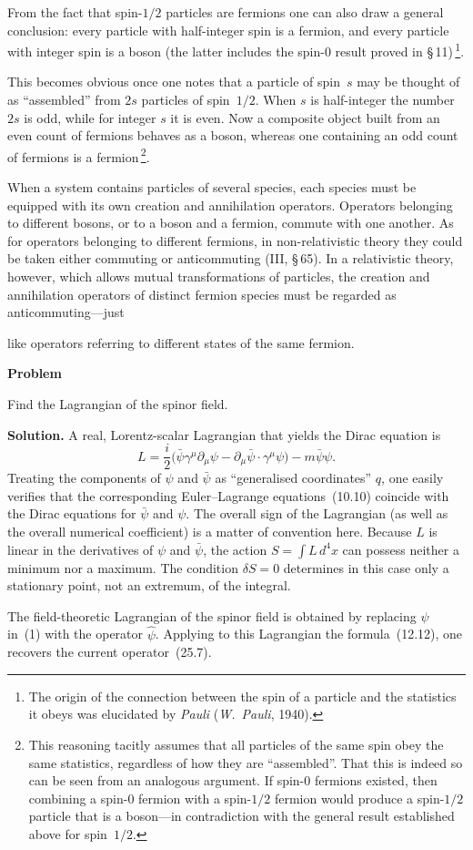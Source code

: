 From the fact that spin-$1/2$ particles are fermions one can also draw a general conclusion: every particle with half-integer spin is a fermion, and every particle with integer spin is a boson (the latter includes the spin-0 result proved in \S\,11)\,\footnote{The origin of the connection between the spin of a particle and the statistics it obeys was elucidated by \emph{Pauli} (\emph{W.~Pauli}, 1940).}.

This becomes obvious once one notes that a particle of spin~$s$ may be thought of as ``assembled'' from $2s$ particles of spin~$1/2$. When $s$ is half-integer the number $2s$ is odd, while for integer $s$ it is even. Now a composite object built from an even count of fermions behaves as a boson, whereas one containing an odd count of fermions is a fermion\,\footnote{This reasoning tacitly assumes that all particles of the same spin obey the same statistics, regardless of how they are ``assembled''. That this is indeed so can be seen from an analogous argument. If spin-0 fermions existed, then combining a spin-0 fermion with a spin-$1/2$ fermion would produce a spin-$1/2$ particle that is a boson---in contradiction with the general result established above for spin~$1/2$.}.

When a system contains particles of several species, each species must be equipped with its own creation and annihilation operators. Operators belonging to different bosons, or to a boson and a fermion, commute with one another. As for operators belonging to different fermions, in non-relativistic theory they could be taken either commuting or anticommuting (III, \S\,65). In a relativistic theory, however, which allows mutual transformations of particles, the creation and annihilation operators of distinct fermion species must be regarded as anticommuting---just

like operators referring to different states of the same fermion.

\begin{center}
\textbf{Problem}
\end{center}

Find the Lagrangian of the spinor field.

\textbf{Solution.} A real, Lorentz-scalar Lagrangian that yields the Dirac equation is
\begin{equation}
L = \frac{i}{2}\bigl(\bar\psi\gamma^\mu\partial_\mu\psi - \partial_\mu\bar\psi\cdot\gamma^\mu\psi\bigr) - m\bar\psi\psi.
\tag*{(1)}
\end{equation}
Treating the components of $\psi$ and $\bar\psi$ as ``generalised coordinates'' $q$, one easily verifies that the corresponding Euler--Lagrange equations~(10.10) coincide with the Dirac equations for $\bar\psi$ and $\psi$. The overall sign of the Lagrangian (as well as the overall numerical coefficient) is a matter of convention here. Because $L$ is linear in the derivatives of $\psi$ and $\bar\psi$, the action $S = \int L\,d^4x$ can possess neither a minimum nor a maximum. The condition $\delta S = 0$ determines in this case only a stationary point, not an extremum, of the integral.

The field-theoretic Lagrangian of the spinor field is obtained by replacing $\psi$ in~(1) with the operator $\widehat\psi$. Applying to this Lagrangian the formula~(12.12), one recovers the current operator~(25.7).
